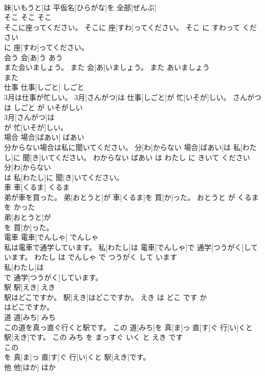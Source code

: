 \documentclass[8pt]{extreport}
\begin{document}
\begin{CJK}{UTF8}{min}
\\	妹[いもうと]は 平仮名[ひらがな]を 全部[ぜんぶ]
\\	そこ	そこ	そこ	
\\	そこに座ってください。	そこに 座[すわ]ってください。	そこ に すわって ください	
\\	に 座[すわ]ってください。			
\\	会う	会[あ]う	あう	
\\	また会いましょう。	また 会[あ]いましょう。	また あいましょう	
\\	また
\\	仕事	仕事[しごと]	しごと	
\\	3月は仕事が忙しい。	3月[さんがつ]は 仕事[しごと]が 忙[いそが]しい。	さんがつ は しごと が いそがしい	
\\	3月[さんがつ]は
\\	が 忙[いそが]しい。			
\\	場合	場合[ばあい]	ばあい	
\\	分からない場合は私に聞いてください。	分[わ]からない 場合[ばあい]は 私[わたし]に 聞[き]いてください。	わからない ばあい は わたし に きいて ください	
\\	分[わ]からない
\\	は 私[わたし]に 聞[き]いてください。			
\\	車	車[くるま]	くるま	
\\	弟が車を買った。	弟[おとうと]が 車[くるま]を 買[か]った。	おとうと が くるま を かった	
\\	弟[おとうと]が
\\	を 買[か]った。			
\\	電車	電車[でんしゃ]	でんしゃ	
\\	私は電車で通学しています。	私[わたし]は 電車[でんしゃ]で 通学[つうがく]しています。	わたし は でんしゃ で つうがく して います	
\\	私[わたし]は
\\	で 通学[つうがく]しています。			
\\	駅	駅[えき]	えき	
\\	駅はどこですか。	駅[えき]はどこですか。	えき は どこ です か	
\\	はどこですか。			
\\	道	道[みち]	みち	
\\	この道を真っ直ぐ行くと駅です。	この 道[みち]を 真[ま]っ 直[す]ぐ 行[い]くと 駅[えき]です。	この みち を まっすぐ いく と えき です	
\\	この
\\	を 真[ま]っ 直[す]ぐ 行[い]くと 駅[えき]です。			
\\	他	他[ほか]	ほか	

\end{CJK}
\end{document}
